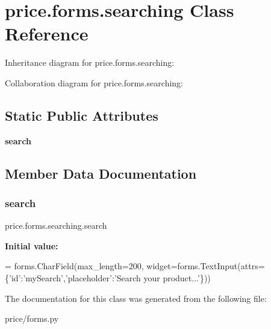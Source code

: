\hypertarget{classprice_1_1forms_1_1searching}{}\section{price.\+forms.\+searching Class Reference}
\label{classprice_1_1forms_1_1searching}


Inheritance diagram for price.\+forms.\+searching\+:


Collaboration diagram for price.\+forms.\+searching\+:
\subsection*{Static Public Attributes}
\begin{DoxyCompactItemize}
\item 
{\bfseries search}
\end{DoxyCompactItemize}


\subsection{Member Data Documentation}
\mbox{\label{classprice_1_1forms_1_1searching_a70989e1c50e48773bb5ac6a15c8e1fd6}} 
\subsubsection{\texorpdfstring{search}{search}}
{\footnotesize\ttfamily price.\+forms.\+searching.\+search\hspace{0.3cm}{\ttfamily [static]}}

{\bfseries Initial value\+:}
\begin{DoxyCode}
= forms.CharField(max\_length=200,
    widget=forms.TextInput(attrs=\{\textcolor{stringliteral}{'id'}:\textcolor{stringliteral}{'mySearch'},\textcolor{stringliteral}{'placeholder'}:\textcolor{stringliteral}{'Search your product...'}\}))
\end{DoxyCode}


The documentation for this class was generated from the following file\+:\begin{DoxyCompactItemize}
\item 
price/forms.\+py\end{DoxyCompactItemize}
